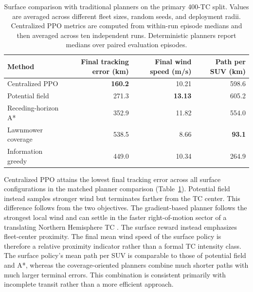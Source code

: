 \documentclass[a4paper,fleqn]{cas-dc}
\begin{document}
\begin{table}[t]
\centering
\caption{Surface comparison with traditional planners on the primary 400-TC split. Values are averaged across different fleet sizes, random seeds, and deployment radii. Centralized PPO metrics are computed from within-run episode medians and then averaged across ten independent runs. Deterministic planners report medians over paired evaluation episodes.}
\label{tab:surface_planner_comparison}
\small
\begin{tabular*}{\textwidth}{@{\extracolsep{\fill}}lrrr@{}}
\toprule
Method & Final tracking error (km) & Final wind speed (m/s) & Path per SUV (km) \\
\midrule
Centralized PPO & \textbf{160.2} & 10.21 & 598.6 \\
Potential field & 271.3 & \textbf{13.13} & 605.2 \\
Receding-horizon A* & 352.9 & 11.82 & 554.0 \\
Lawnmower coverage & 538.5 & 8.66 & \textbf{93.1} \\
Information greedy & 449.0 & 10.34 & 264.9 \\
\bottomrule
\end{tabular*}
\end{table}

Centralized PPO attains the lowest final tracking error across all surface
configurations in the matched planner comparison
(Table~\ref{tab:surface_planner_comparison}).
Potential field instead samples stronger wind but terminates farther from the
TC center. This difference follows from the two objectives. The gradient-based
planner follows the strongest local wind and can settle in the faster
right-of-motion sector of a translating Northern Hemisphere TC \citep{r63}. The
surface reward instead emphasizes fleet-center proximity. The final mean wind
speed of the surface policy is therefore a relative proximity indicator rather
than a formal TC intensity class. The surface policy's mean path per SUV is
comparable to those of potential field and A*, whereas the coverage-oriented
planners combine much shorter paths with much larger terminal errors. This
combination is consistent primarily with incomplete transit rather than a more
efficient approach.
\end{document}
